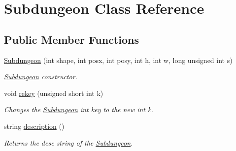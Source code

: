 \hypertarget{classSubdungeon}{\section{Subdungeon Class Reference}
\label{classSubdungeon}
}
\subsection*{Public Member Functions}
\begin{DoxyCompactItemize}
\item 
\hyperlink{classSubdungeon_a584b2b8d5206daf856a4b2ce7f1a5fda}{Subdungeon} (int shape, int posx, int posy, int h, int w, long unsigned int s)
\begin{DoxyCompactList}\small\item\em \hyperlink{classSubdungeon}{Subdungeon} constructor. \end{DoxyCompactList}\item 
\hypertarget{classSubdungeon_aeaaac26dcff93b722357f6d61c2d96d8}{void \hyperlink{classSubdungeon_aeaaac26dcff93b722357f6d61c2d96d8}{rekey} (unsigned short int k)}\label{classSubdungeon_aeaaac26dcff93b722357f6d61c2d96d8}

\begin{DoxyCompactList}\small\item\em Changes the \hyperlink{classSubdungeon}{Subdungeon} int key to the new int k. \end{DoxyCompactList}\item 
\hypertarget{classSubdungeon_aba31268ab8b0dcbaf2633f7fb8332f33}{string \hyperlink{classSubdungeon_aba31268ab8b0dcbaf2633f7fb8332f33}{description} ()}\label{classSubdungeon_aba31268ab8b0dcbaf2633f7fb8332f33}

\begin{DoxyCompactList}\small\item\em Returns the desc string of the \hyperlink{classSubdungeon}{Subdungeon}. \end{DoxyCompactList}\end{DoxyCompactItemize}
